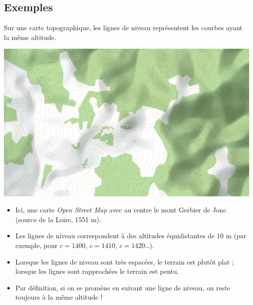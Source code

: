 \begin{exemple}{}{}
	
\end{exemple}


\subsection{Exemples}

\begin{exemple}{}{}
	Sur une carte topographique, les lignes de niveau représentent les courbes ayant la même altitude. 
	\begin{center}
		\includegraphics[scale=0.3]{figures/fig-fonctions-topo}
	\end{center}
	\begin{itemize}
		\item Ici, une carte \emph{Open Street Map} avec au centre le mont Gerbier de Jonc (source de la Loire, 1551 m). 
		\item Les lignes de niveau correspondent à des altitudes équidistantes de $10$ m (par exemple, pour $c=1400$, $c=1410$, $c=1420$\ldots).
		\item Lorsque les lignes de niveau sont très espacées, le terrain est plutôt plat ; lorsque les lignes sont rapprochées le terrain est pentu.
		\item Par définition, si on se promène en suivant une ligne de niveau, on reste toujours à la même altitude !
	\end{itemize}
\end{exemple}



